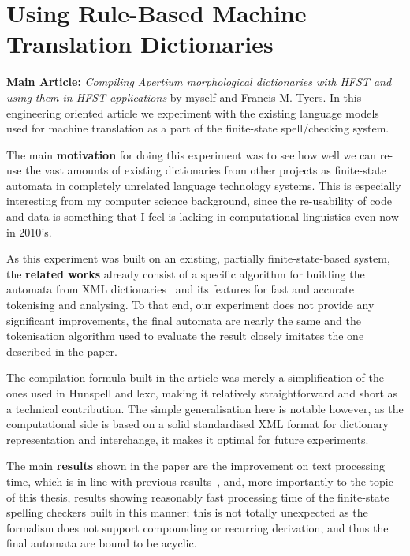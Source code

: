 \documentclass[officiallayout]{unihelcompling}
\begin{document}
\section{Using Rule-Based Machine Translation Dictionaries}
\label{sec:apertium}

\textbf{Main Article:} \emph{Compiling Apertium morphological dictionaries with
HFST and using them in HFST applications} by myself and Francis M. Tyers. In
this engineering oriented article we experiment with the existing language
models used for machine translation as a part of the finite-state
spell\-/checking system.

The main \textbf{motivation} for doing this experiment was to see how well we
can re-use the vast amounts of existing dictionaries from other projects as
finite-state automata in completely unrelated language technology systems.
This is especially interesting from my computer science background, since
the re-usability of code and data is something that I feel is lacking in
computational linguistics even now in 2010's.

As this experiment was built on an existing, partially finite-state-based
system, the \textbf{related works} already consist of a specific algorithm for
building the automata from XML dictionaries~\citep{rojas2005construccion} and
its features for fast and accurate tokenising and analysing. To that end, our
experiment does not provide any significant improvements, the final automata
are nearly the same and the tokenisation algorithm used to evaluate the result
closely imitates the one described in the paper.

The compilation formula built in the article was merely a simplification of
the ones used in Hunspell and lexc, making it relatively straightforward and
short as a technical contribution. The simple generalisation here is notable
however, as the computational side is based on a solid standardised XML
format for dictionary representation and interchange, it makes it optimal
for future experiments.

The main \textbf{results} shown in the paper are the improvement on text
processing time, which is in line with previous
results~\citep{silfverberg2009hfst}, and, more importantly to the topic of this
thesis, results showing reasonably fast processing time of the finite-state
spelling checkers built in this manner; this is not totally unexpected as the
formalism does not support compounding or recurring derivation, and thus the
final automata are bound to be acyclic. 
\end{document}

